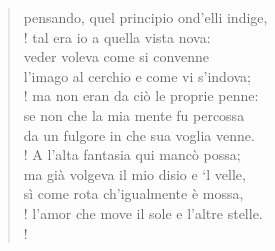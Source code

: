\documentclass[a4paper, twoside, titlepage]{book}
\begin{document}
\begin{verse}
pensando, quel principio ond’elli indige,\\!
tal era io a quella vista nova:\\
veder voleva come si convenne\\
l’imago al cerchio e come vi s’indova;\\!
ma non eran da ciò le proprie penne:\\
se non che la mia mente fu percossa\\
da un fulgore in che sua voglia venne.\\!
A l’alta fantasia qui mancò possa;\\
ma già volgeva il mio disio e ‘l velle,\\
sì come rota ch’igualmente è mossa,\\!
l’amor che move il sole e l’altre stelle.\\!
\end{verse}
\end{document}
